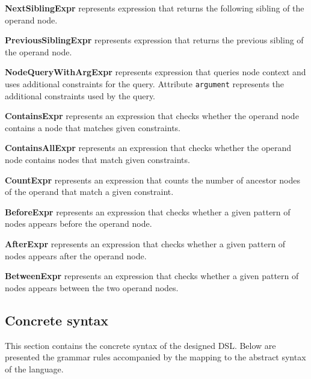 \begin{description}

\item\textbf{NextSiblingExpr} represents expression that returns the following sibling of the operand node.

\item\textbf{PreviousSiblingExpr} represents expression that returns the previous sibling of the operand node.

\item\textbf{NodeQueryWithArgExpr} represents expression that queries node context and uses additional constraints for the query. Attribute \texttt{argument} represents the additional constraints used by the query.

\item\textbf{ContainsExpr} represents an expression that checks whether the operand node contains a node that matches given constraints.

\item\textbf{ContainsAllExpr} represents an expression that checks whether the operand node contains nodes that match given constraints.

\item\textbf{CountExpr} represents an expression that counts the number of ancestor nodes of the operand that match a given constraint.

\item\textbf{BeforeExpr} represents an expression that checks whether a given pattern of nodes appears before the operand node.

\item\textbf{AfterExpr} represents an expression that checks whether a given pattern of nodes appears after the operand node.

\item\textbf{BetweenExpr} represents an expression that checks whether a given pattern of nodes appears between the two operand nodes.

\end{description}

\subsection{Concrete syntax}

This section contains the concrete syntax of the designed DSL. Below are presented the grammar rules accompanied by the mapping to the abstract syntax of the language.


